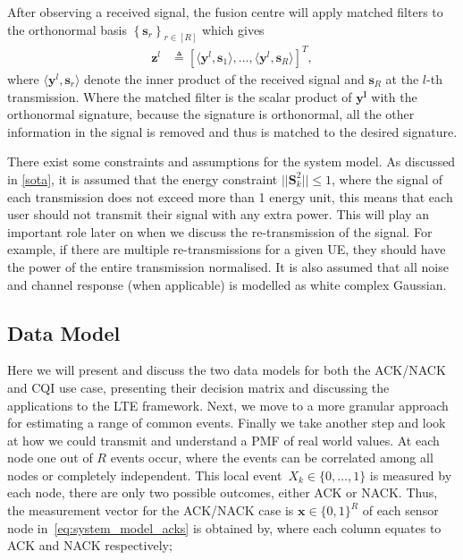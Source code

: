 \documentclass{article}
\begin{document}
After observing a received signal, the fusion centre will apply matched filters to the orthonormal basis $\left\{ \boldsymbol{s}_r\right\}_{r \in [R]}$ which gives
%
\begin{align}
    \boldsymbol{z}^l &\triangleq \left[\langle \boldsymbol{y}^l, \boldsymbol{s}_1\rangle, \ldots, \langle \boldsymbol{y}^l, \boldsymbol{s}_R\rangle  \right]^T, \label{eq:mf_output}
\end{align}
where $\langle \boldsymbol{y}^l, \boldsymbol{s}_r\rangle$ denote the inner product of the received signal and $\boldsymbol{s}_R$ at the $l$-th transmission. Where the matched filter is the scalar product of $\boldsymbol{y^l}$ with the orthonormal signature, because the signature is orthonormal, all the other information in the signal is removed and thus is matched to the desired signature.

There exist some constraints and assumptions for the system model. As discussed in \cref{sota}, it is assumed that the energy constraint $||\boldsymbol{S}_{k}^2|| \leq 1$, where the signal of each transmission does not exceed more than 1 energy unit, this means that each user should not transmit their signal with any extra power. This will play an important role later on when we discuss the re-transmission of the signal. For example, if there are multiple re-transmissions for a given \ac{UE}, they should have the power of the entire transmission normalised.  It is also assumed that all noise and channel response (when applicable) is modelled as white complex Gaussian.   

\subsection{Data Model}\label{data_models}

Here we will present and discuss the two data models for both the ACK/NACK and CQI use case, presenting their decision matrix and discussing the applications to the LTE framework. Next, we move to a more granular approach for estimating a range of common events. Finally we take another step and look at how we could transmit and understand a PMF of real world values. 
At each node one out of $R$ events occur, where the events can be correlated among all nodes or completely independent. This local event~${X_k \in \{0, \ldots, 1\}}$ is measured by each node, there are only two possible outcomes, either ACK or NACK. Thus, the measurement vector for the ACK/NACK case is $\boldsymbol{x} \in \{0,1\}^{R}$ of each sensor node in~\cref{eq:system_model_acks} is obtained by, where each column equates to ACK and NACK respectively;
\end{document}
